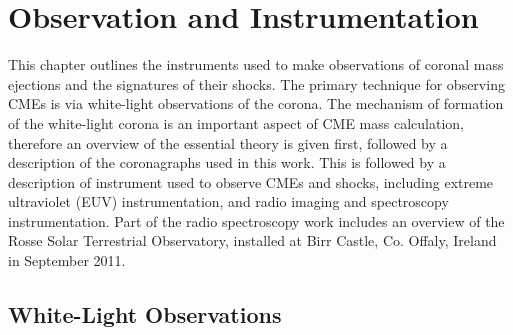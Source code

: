 
\singlespacing
\chapter{Observation and Instrumentation} 
\label{chap:3}
\doublespacing
This chapter outlines the instruments used to make observations of coronal mass ejections and the signatures of their shocks. The primary technique for observing CMEs is via white-light observations of the corona. The mechanism of formation of the white-light corona is an important aspect of CME mass calculation, therefore an overview of the essential theory is given first, followed by a description of the coronagraphs used in this work. This is followed by a description of instrument used to observe CMEs and shocks, including extreme ultraviolet (EUV) instrumentation, and radio imaging and spectroscopy instrumentation. Part of the radio spectroscopy work includes an overview of the Rosse Solar Terrestrial Observatory, installed at Birr Castle, Co. Offaly, Ireland in September 2011.
\clearpage
\singlespacing
\section{White-Light Observations}\label{sec:1}

